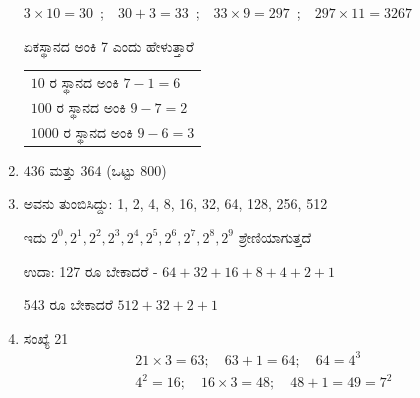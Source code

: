 \begin{enumerate}
$3 \times 10 = 30$~;~~$30 + 3 = 33$~;~~$33 \times 9 = 297$~;~~$297 \times 11 = 3267$ 

ಏಕಸ್ಥಾನದ ಅಂಕಿ 7 ಎಂದು ಹೇಳುತ್ತಾರೆ 

\begin{tabular}{l}
$10$ ರ ಸ್ಥಾನದ ಅಂಕಿ $7-1 = 6$\\
$100$ ರ ಸ್ಥಾನದ ಅಂಕಿ $9-7 = 2$\\
$1000$ ರ ಸ್ಥಾನದ ಅಂಕಿ $9-6 = 3$
\end{tabular}

\item $436$ ಮತ್ತು $364$ (ಒಟ್ಟು $800$)

\item ಅವನು ತುಂಬಿಸಿದ್ದು: 1, 2, 4, 8, 16, 32, 64, 128, 256, 512

ಇದು $2^{0}, 2^{1}, 2^{2}, 2^{3}, 2^{4}, 2^{5}, 2^{6}, 2^{7}, 2^{8}, 2^{9}$ ಶ್ರೇಣಿಯಾಗುತ್ತದೆ 

ಉದಾ: 127 ರೂ ಬೇಕಾದರೆ - $64+32+16+8+4+2+1$

543 ರೂ ಬೇಕಾದರೆ $512+32+2+1$

\item ಸಂಖ್ಯೆ 21
\begin{gather*}
21 \times 3=63;\quad 63+1=64;\quad 64=4^{3}\\
4^{2}=16;\quad 16\times 3=48;\quad 48+1=49=7^{2}
\end{gather*}
\end{enumerate}
